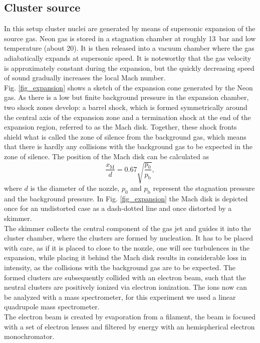 \documentclass[a4paper,10pt]{article}
\renewcommand{\k}{\mathbf{k}}
\begin{document}
\subsection{Cluster source} 
In this setup cluster nuclei are generated by means of supersonic expansion of the source gas. Neon gas is stored in a stagnation chamber at roughly \SI{13}{\bar} and low temperature (about \SI{20}{\k}). It is then released into a vacuum chamber where the gas adiabatically expands at supersonic speed. It is noteworthy that the gas velocity is approximately constant during the expansion, but the quickly decreasing speed of sound gradually increases the local Mach number. \\
Fig. \ref{fig_expansion} shows a sketch of the expansion cone generated by the Neon gas. As there is a low but finite background pressure in the expansion chamber, two shock zones develop: a barrel shock, which is formed symmetrically around the central axis of the expansion zone and a termination shock at the end of the expansion region, referred to as the Mach disk. Together, these shock fronts shield what is called the zone of silence from the background gas, which means that there is hardly any collisions with the background gas to be expected in the zone of silence. The position of the Mach disk can be calculated as 
\begin{equation}
	\frac{x_\mathrm{M}}{d} = 0.67 \sqrt{\frac{p_0}{p_\mathrm{b}}}, 
\end{equation}
where $d$ is the diameter of the nozzle, $p_0$ and $p_\mathrm{b}$ represent the stagnation pressure and the background pressure. In Fig. \ref{fig_expansion} the Mach disk is depicted once for an undistorted case as a dash-dotted line and once distorted by a skimmer. \\
The skimmer collects the central component of the gas jet and guides it into the cluster chamber, where the clusters are formed by nucleation. It has to be placed with care, as if it is placed to close to the nozzle, one will see turbulences in the expansion, while placing it behind the Mach disk results in considerable loss in intensity, as the collisions with the background gas are to be expected. The formed clusters are subsequently collided with an electron beam, such that the neutral clusters are positively ionized via electron ionization. The ions now can be analyzed with a mass spectrometer, for this experiment we used a linear quadrupole mass spectrometer.\\
The electron beam is created by evaporation from a filament, the beam is focused with a set of electron lenses and filtered by energy with an hemispherical electron monochromator.
\end{document}
